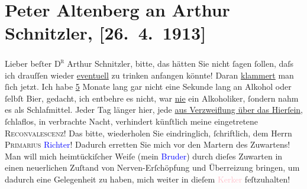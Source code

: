 

               \section[Peter Altenberg an Arthur Schnitzler, {[}26. 4. 1913{]}]{ Peter Altenberg an Arthur Schnitzler, {[}26. 4. 1913{]}}\nopagebreak{}\rehead{ }\normalsize\beginnumbering{} \toendnotes[C]{\smallbreak\pagebreak[2]} 
\toendnotes[C]{\smallbreak}\pstart{}{\pb}Lieber beſter \textsc{D\textsuperscript{r}} Arthur Schnitzler,\pend\pstart
           bitte, das hätten Sie nicht ſagen ſollen, daſs ich drauſſen wieder \uline{eventuell} zu trinken anfangen könnte! Daran \uline{klammert} man ſich jetzt. Ich habe \uline{5} Monate lang gar
                    nicht eine Sekunde lang an Alkohol oder ſelbſt Bier, gedacht, ich entbehre es
                    nicht, war \uline{nie} ein Alkoholiker, ſondern nahm es
                    als Schlafmittel.\pend
           \pstart
           Jeder Tag länger hier, jede \uline{aus Verzweiflung über das
                        Hierſein}, ſchlaflos, in 
                    verbrachte Nacht, verhindert künſtlich meine eingetretene {\pb}\textsc{Reconvalescenz}! Das bitte, wiederholen Sie
                    eindringlich, ſchriftlich, dem Herrn \textsc{Primarius}{ }\textcolor{blue}{Richter}{}\ledrightnote{\textcolor{blue}{Karl Richter}}! Dadurch erretten Sie mich vor den
                    Martern des Zuwartens! Man will mich heimtückiſcher Weiſe (mein \textcolor{blue}{Bruder}{}) durch dieſes
                    Zuwarten in einen neuerlichen Zuſtand von Nerven-Erſchöpfung und Überreizung
                    bringen, um dadurch eine {\pb}Gelegenheit
                    zu haben, mich weiter in dieſem \textcolor{pink}{Kerker}{} feſtzuhalten!\pend

